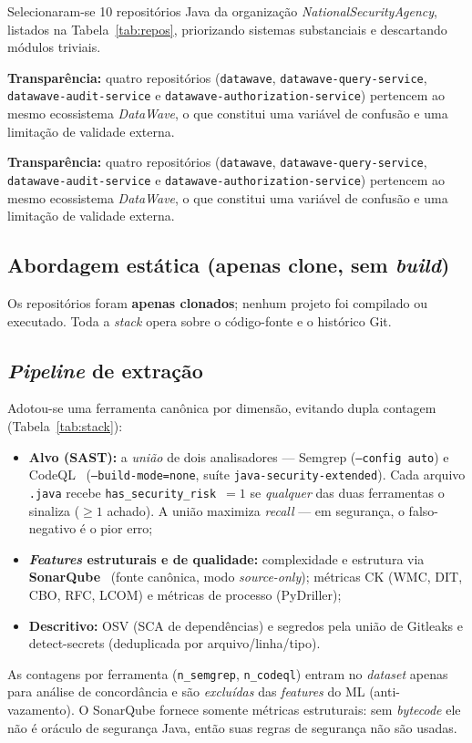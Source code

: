 \documentclass[12pt]{article}
\begin{document}
Selecionaram-se 10 repositórios Java da organização
\textit{NationalSecurityAgency}, listados na Tabela~\ref{tab:repos},
priorizando sistemas substanciais e descartando módulos triviais.

\textbf{Transparência:} quatro repositórios
(\texttt{datawave}, \texttt{datawave-query-service},
\texttt{datawave-audit-service} e
\texttt{datawave-authorization-service}) pertencem ao mesmo ecossistema
\emph{DataWave}, o que constitui uma variável de confusão e uma limitação de
validade externa.

\nocite{nsa_github,nsa_ghidra,nsa_emissary,nsa_timely,nsa_datawave,nsa_fractalrabbit,nsa_lemongrenade,nsa_dwquery,nsa_dwaudit,nsa_dwauthz,nsa_ranklinkage}

\textbf{Transparência:} quatro repositórios
(\texttt{datawave}, \texttt{datawave-query-service},
\texttt{datawave-audit-service} e
\texttt{datawave-authorization-service}) pertencem ao mesmo ecossistema
\emph{DataWave}, o que constitui uma variável de confusão e uma limitação de
validade externa.

\subsection{Abordagem estática (apenas clone, sem \textit{build})}
Os repositórios foram \textbf{apenas clonados}; nenhum projeto foi compilado ou
executado. Toda a \textit{stack} opera sobre o código-fonte e o histórico Git.

\subsection{\textit{Pipeline} de extração}
Adotou-se uma ferramenta canônica por dimensão, evitando dupla contagem
(Tabela~\ref{tab:stack}):
\begin{itemize}
  \item \textbf{Alvo (SAST):} a \emph{união} de dois analisadores ---
  Semgrep (\texttt{--config auto}) e CodeQL~\cite{codeql}
  (\texttt{--build-mode=none}, suíte \texttt{java-security-extended}). Cada arquivo \texttt{.java} recebe
  \texttt{has\_security\_risk}~$=1$ se \emph{qualquer} das duas ferramentas o
  sinaliza ($\geq 1$ achado). A união maximiza \textit{recall} --- em segurança,
  o falso-negativo é o pior erro;
  \item \textbf{\textit{Features} estruturais e de qualidade:} complexidade e
  estrutura via \textbf{SonarQube}~\cite{sonarqube} (fonte canônica, modo
  \textit{source-only});
  métricas CK (WMC, DIT, CBO, RFC, LCOM) e métricas de processo (PyDriller);
  \item \textbf{Descritivo:} OSV (SCA de dependências) e segredos pela união de
  Gitleaks e detect-secrets (deduplicada por arquivo/linha/tipo).
\end{itemize}
As contagens por ferramenta (\texttt{n\_semgrep}, \texttt{n\_codeql}) entram no
\textit{dataset} apenas para análise de concordância e são \emph{excluídas} das
\textit{features} do ML (anti-vazamento). O SonarQube fornece somente métricas
estruturais: sem \textit{bytecode} ele não é oráculo de segurança Java, então
suas regras de segurança não são usadas.
\end{document}
